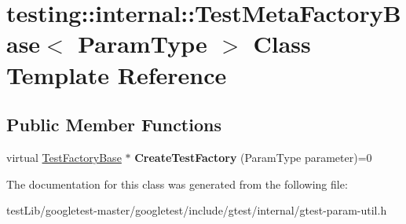\hypertarget{classtesting_1_1internal_1_1TestMetaFactoryBase}{}\section{testing\+:\+:internal\+:\+:Test\+Meta\+Factory\+Base$<$ Param\+Type $>$ Class Template Reference}
\label{classtesting_1_1internal_1_1TestMetaFactoryBase}
\subsection*{Public Member Functions}
\begin{DoxyCompactItemize}
\item 
\mbox{\label{classtesting_1_1internal_1_1TestMetaFactoryBase_a853daab362740bcac55e180128d564ef}} 
virtual \hyperlink{classtesting_1_1internal_1_1TestFactoryBase}{Test\+Factory\+Base} $\ast$ {\bfseries Create\+Test\+Factory} (Param\+Type parameter)=0
\end{DoxyCompactItemize}


The documentation for this class was generated from the following file\+:\begin{DoxyCompactItemize}
\item 
test\+Lib/googletest-\/master/googletest/include/gtest/internal/gtest-\/param-\/util.\+h\end{DoxyCompactItemize}
